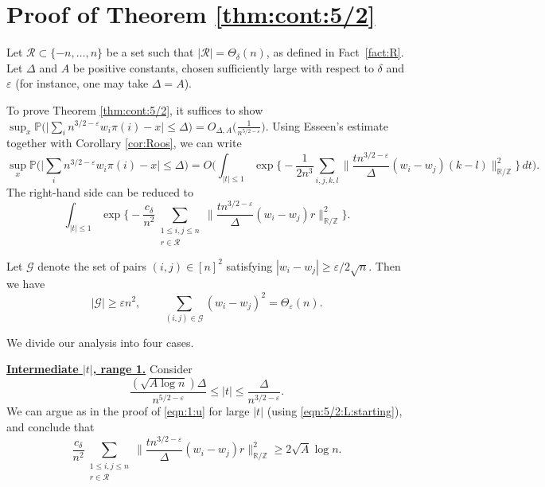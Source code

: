 \documentclass[reqno]{amsart}
\newcommand\R{{\mathbb{R}}}
\newcommand\Z{{\mathbb{Z}}}
\renewcommand\P{{\mathbb{P}}}
\newcommand\eps{{\varepsilon}}
\newcommand\CG{{\mathcal G}}
\newcommand\CR{{\mathcal R}}
\theoremstyle{plain}
\theoremstyle{definition}
\begin{document}
\appendix 




\section{Proof of Theorem \ref{thm:cont:5/2}}\label{sec:proof-5/2}

Let $\CR\subset\{-n, \dots, n\}$ be a set such that $|\CR| = \Theta_{\delta}(n)$, as defined in Fact~\ref{fact:R}. Let $\Delta$ and $A$ be positive constants, chosen sufficiently large with respect to $\delta$ and $\eps$ (for instance, one may take $\Delta=A$).


To prove Theorem \ref{thm:cont:5/2}, it suffices to show $\sup_{x} \P\big(\big|\sum_{i} n^{3/2-\eps}w_{i} \pi(i) - x\big| \le \Delta\big)=O_{\Delta,A}\big( \frac{1}{n^{5/2 - \eps}} \big)$. Using Esseen's estimate together with Corollary \ref{cor:Roos}, we can write
\[
\sup_{x} \P\Big(\Big|\sum_{i} n^{3/2-\eps}w_{i} \pi(i) - x\Big| \le \Delta\Big)  
=O\Big(\int_{|t| \le 1} \exp \Big\{ - \frac{1}{2n^{3}} \sum_{i,j,k,l} \Big\| \frac{t n^{3/2-\eps}}{\Delta}(w_{i}-w_{j})(k-l)\Big\|_{\R/\Z}^{2}\Big\}\, dt\Big).
\]
The right-hand side can be reduced to 
\begin{equation}\label{eqn:int:5/2}
 \int_{|t| \le 1} \exp\Big\{- \frac{c_{\delta}}{n^{2}} \sum_{\substack{1\le i,j \le n \\r \in \CR}} \Big\| \frac{t n^{3/2-\eps}}{\Delta} (w_{i}-w_{j}) r\Big\|_{\R/\Z}^{2}\Big\}.
\end{equation}

Let $\CG$ denote the set of pairs $(i,j)\in [n]^2$ satisfying $|w_{i}-w_{j}| \ge \eps/2\sqrt{n}$.
Then we have 
\begin{equation}\label{eqn:5/2:L:starting}
|\CG|\ge \eps n^2, \qquad \sum_{(i,j)\in \CG} (w_{i}-w_{j})^{2} =\Theta_{\eps}(n).
\end{equation}

We divide our analysis into four cases.

\underline{\bf Intermediate \(|t|\), range 1.}  
Consider
\[
\frac{(\sqrt{A\log n})\Delta}{n^{5/2-\eps}} \le |t| \le \frac{\Delta}{n^{3/2-\eps}}.
\]
We can argue as in the proof of \eqref{eqn:1:u} for large $|t|$ (using \eqref{eqn:5/2:L:starting}), and conclude that
\[
\frac{c_{\delta}}{n^{2}} \sum_{\substack{1\le i,j \le n \\r \in \CR}} \Big\| \frac{t n^{3/2-\eps}}{\Delta} (w_{i}-w_{j}) r\Big\|_{\R/\Z}^{2} \ge 2\sqrt{A}\log n.
\]
\end{document}
